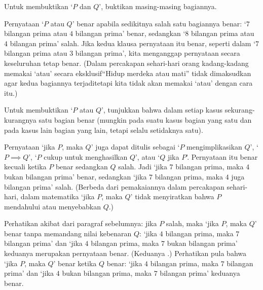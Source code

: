 Untuk membuktikan `\( P \) dan \( Q \)', buktikan masing-masing bagiannya.




Pernyataan `\( P \) atau \( Q \)' benar apabila sedikitnya salah satu
bagiannya benar:
`\( 7 \) bilangan prima atau \( 4 \) bilangan prima' benar, sedangkan
`\( 8 \) bilangan prima atau \( 4 \) bilangan prima' salah.
Jika kedua klausa pernyataan itu benar,
seperti dalam `\( 7 \) bilangan prima atau \( 3 \) bilangan prima',
kita menganggap pernyataan secara keseluruhan tetap benar.
(Dalam percakapan sehari-hari orang kadang-kadang memakai `atau' secara
eksklusif\Dash ``Hidup merdeka atau mati'' tidak dimaksudkan agar kedua
bagiannya terjadi\Dash tetapi kita tidak akan memakai `atau' dengan cara itu.)

Untuk membuktikan `\( P \) atau \( Q \)', tunjukkan bahwa dalam setiap kasus
sekurang-kurangnya satu bagian benar (mungkin pada suatu kasus bagian yang
satu dan pada kasus lain bagian yang lain, tetapi selalu setidaknya satu).



Pernyataan `jika \( P \), maka \( Q \)' juga dapat ditulis sebagai
`\( P \) mengimplikasikan \( Q \)', `\( P\implies Q\)',
`\( P \) cukup untuk menghasilkan \( Q \)', atau `$Q$ jika $P$'.
Pernyataan itu benar kecuali ketika \( P \) benar sedangkan \( Q \) salah.
Jadi `jika \( 7 \) bilangan prima, maka \( 4 \) bukan bilangan prima' benar,
sedangkan `jika \( 7 \) bilangan prima, maka \( 4 \) juga bilangan prima' salah.
(Berbeda dari pemakaiannya dalam percakapan sehari-hari, dalam matematika
`jika \( P \), maka \( Q \)' tidak menyiratkan bahwa \( P \) mendahului
atau menyebabkan \( Q \).)

Perhatikan akibat dari paragraf sebelumnya: jika $P$ salah, maka
`jika \( P \), maka \( Q \)' benar tanpa memandang nilai kebenaran $Q$:
`jika \( 4 \) bilangan prima, maka \( 7 \) bilangan prima' dan
`jika \( 4 \) bilangan prima, maka \( 7 \) bukan bilangan prima'
keduanya merupakan pernyataan benar.
(Keduanya .)
Perhatikan pula bahwa `jika \( P \), maka \( Q \)' benar ketika $Q$ benar:
`jika $4$ bilangan prima, maka $7$ bilangan prima' dan
`jika $4$ bukan bilangan prima, maka $7$ bilangan prima' keduanya benar.


